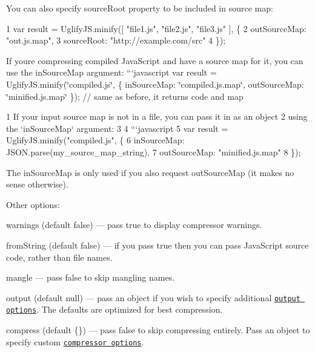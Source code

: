 You can also specify source\+Root property to be included in source map\+: 
\begin{DoxyCode}
1 var result = UglifyJS.minify([ "file1.js", "file2.js", "file3.js" ], \{
2     outSourceMap: "out.js.map",
3     sourceRoot: "http://example.com/src"
4 \});
\end{DoxyCode}


If you\textquotesingle{}re compressing compiled Java\+Script and have a source map for it, you can use the {\ttfamily in\+Source\+Map} argument\+: ```javascript var result = Uglify\+J\+S.\+minify(\char`\"{}compiled.\+js\char`\"{}, \{ in\+Source\+Map\+: \char`\"{}compiled.\+js.\+map\char`\"{}, out\+Source\+Map\+: \char`\"{}minified.\+js.\+map\char`\"{} \}); // same as before, it returns {\ttfamily code} and {\ttfamily map} 
\begin{DoxyCode}
1 If your input source map is not in a file, you can pass it in as an object
2 using the `inSourceMap` argument:
3 
4 ```javascript
5 var result = UglifyJS.minify("compiled.js", \{
6     inSourceMap: JSON.parse(my\_source\_map\_string),
7     outSourceMap: "minified.js.map"
8 \});
\end{DoxyCode}


The {\ttfamily in\+Source\+Map} is only used if you also request {\ttfamily out\+Source\+Map} (it makes no sense otherwise).

Other options\+:


\begin{DoxyItemize}
\item {\ttfamily warnings} (default {\ttfamily false}) — pass {\ttfamily true} to display compressor warnings.
\item {\ttfamily from\+String} (default {\ttfamily false}) — if you pass {\ttfamily true} then you can pass Java\+Script source code, rather than file names.
\item {\ttfamily mangle} — pass {\ttfamily false} to skip mangling names.
\item {\ttfamily output} (default {\ttfamily null}) — pass an object if you wish to specify additional \href{http://lisperator.net/uglifyjs/codegen}{\tt output options}. The defaults are optimized for best compression.
\item {\ttfamily compress} (default {\ttfamily \{\}}) — pass {\ttfamily false} to skip compressing entirely. Pass an object to specify custom \href{http://lisperator.net/uglifyjs/compress}{\tt compressor options}.
\end{DoxyItemize}

